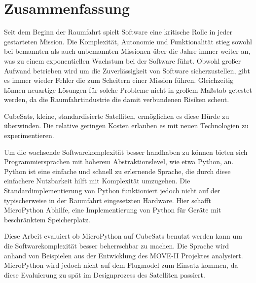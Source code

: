 \cleardoublepage
\section*{Zusammenfassung}

Seit dem Beginn der Raumfahrt spielt Software eine kritische Rolle in jeder gestarteten Mission. Die Komplexität, Autonomie und Funktionalität stieg sowohl bei bemannten als auch unbemannten Missionen über die Jahre immer weiter an, was zu einem exponentiellen Wachstum bei der Software führt.
Obwohl großer Aufwand betrieben wird um die Zuverlässigkeit von Software sicherzustellen, gibt es immer wieder Fehler die zum Scheitern einer Mission führen. Gleichzeitig können neuartige Lösungen für solche Probleme nicht in großem Maßstab getestet werden, da die Raumfahrtindustrie die damit verbundenen Risiken scheut.

CubeSats, kleine, standardisierte Satelliten, ermöglichen es diese Hürde zu überwinden. Die relative geringen Kosten erlauben es mit neuen Technologien zu experimentieren.

Um die wachsende Softwarekomplexität besser handhaben zu können bieten sich Programmiersprachen mit höherem Abstraktionslevel, wie etwa Python, an. Python ist eine einfache und schnell zu erlernende Sprache, die durch diese einfachere Nutzbarkeit hilft mit Komplexität umzugehen. Die Standardimplementierung von Python funktioniert jedoch nicht auf der typischerweise in der Raumfahrt eingesetzten Hardware. Hier schafft MicroPython Abhilfe, eine Implementierung von Python für Geräte mit beschränktem Speicherplatz.

Diese Arbeit evaluiert ob MicroPython auf CubeSats benutzt werden kann um die Softwarekomplexität besser beherrschbar zu machen. Die Sprache wird anhand von Beispielen aus der Entwicklung des MOVE-II Projektes analysiert. MicroPython wird jedoch nicht auf dem Flugmodel zum Einsatz kommen, da diese Evaluierung zu spät im Designprozess des Satelliten passiert.

